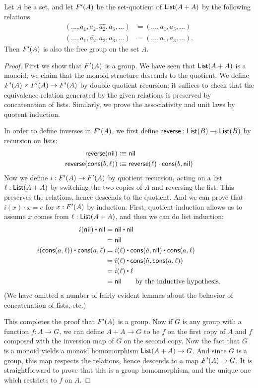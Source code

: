 \begin{thm}
  Let $A$ be a set, and let $F'(A)$ be the set-quotient of $\mathsf{List}(A+A)$ by the following relations.
  \begin{align*}
    (\dots,a_1,a_2,\widehat{a_2},a_3,\dots) &=
    (\dots,a_1,a_3,\dots)\\
    (\dots,a_1,\widehat{a_2},a_2,a_3,\dots) &=
    (\dots,a_1,a_3,\dots).
  \end{align*}
  Then $F'(A)$ is also the free group on the set $A$.
\end{thm}
\begin{proof}
  First we show that $F'(A)$ is a group.
  We have seen that $\mathsf{List}(A+A)$ is a monoid; we claim that the monoid structure descends to the quotient.
  We define $F'(A) \times F'(A) \to F'(A)$ by double quotient recursion; it suffices to check that the equivalence relation generated by the given relations is preserved by concatenation of lists.
  Similarly, we prove the associativity and unit laws by quotent induction.

  In order to define inverses in $F'(A)$, we first define $\mathsf{reverse}:\mathsf{List}(B)\to\mathsf{List}(B)$ by recursion on lists:
  \begin{align*}
    \mathsf{reverse}(\mathsf{nil}) &\vcentcolon\equiv \mathsf{nil}\\
    \mathsf{reverse}(\mathsf{cons}(b,\ell))&\vcentcolon\equiv \mathsf{reverse}(\ell)\cdot \mathsf{cons}(b,\mathsf{nil})
  \end{align*}
  Now we define $i:F'(A)\to F'(A)$ by quotient recursion, acting on a list $\ell:\mathsf{List}(A+A)$ by switching the two copies of $A$ and reversing the list.
  This preserves the relations, hence descends to the quotient.
  And we can prove that $i(x) \cdot x = e$ for $x:F'(A)$ by induction.
  First, quotient induction allows us to assume $x$ comes from $\ell:\mathsf{List}(A+A)$, and then we can do list induction:
  \begin{align*}
    i(\nil) \ct \nil &= \nil \ct \nil\\
    &= \nil\\
    i(\cons(a,\ell)) \ct \cons(a,\ell) &= i(\ell) \ct \cons(\hat{a},\nil) \ct \cons(a,\ell)\\
    &= i(\ell) \ct \cons(\hat{a},\cons(a,\ell))\\
    &= i(\ell) \ct \ell\\
    &= \nil \qquad\text{by the inductive hypothesis.}
  \end{align*}
  (We have omitted a number of fairly evident lemmas about the behavior of concatenation of lists, etc.)

  This completes the proof that $F'(A)$ is a group.
  Now if $G$ is any group with a function $f:A\to G$, we can define $A+A\to G$ to be $f$ on the first copy of $A$ and $f$ composed with the inversion map of $G$ on the second copy.
  Now the fact that $G$ is a monoid yields a monoid homomorphism $\mathsf{List}(A+A) \to G$.
  And since $G$ is a group, this map respects the relations, hence descends to a map $F'(A)\to G$.
  It is straightforward to prove that this is a group homomorphism, and the unique one which restricts to $f$ on $A$.
\end{proof}

